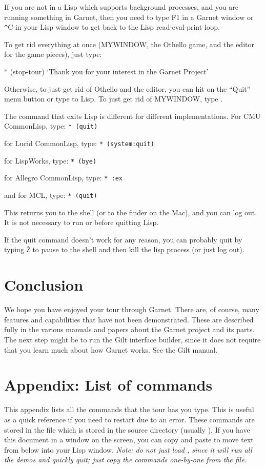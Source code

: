 If you are not in a Lisp which supports background processes, and
you are running something in Garnet, then you need to type F1 in a
Garnet window or {\texttt \^}C in your Lisp window to get back to the Lisp
read-eval-print loop.

To get rid everything at once (MYWINDOW, the Othello game, and the
editor for the game pieces), just type:
\begin{programexample}
* (stop-tour)
`Thank you for your interest in the Garnet Project'
\end{programexample}

Otherwise,
to just get rid of Othello and the editor, you can hit on the ``Quit'' menu
button or type  to Lisp.  To just get rid of MYWINDOW,
type .

The command that exits Lisp is different for different implementations.
For CMU CommonLisp, type: \verb+* (quit)+

for Lucid CommonLisp, type: \verb+* (system:quit)+

for LispWorks, type: \verb+* (bye)+

for Allegro CommonLisp, type: \verb+* :ex+

and for MCL, type: \verb+* (quit)+

This returns you to the shell (or to the finder on the Mac), and you
can log out.  It is not necessary to run  or
 before quitting Lisp.

If the quit command doesn't work for any reason,
you can probably quit by typing \texttt{\^Z} to pause to the shell and
then kill the lisp process (or just log out).

\chapter{Conclusion}
We hope you have enjoyed your tour through Garnet.  There are, of course,
many features and capabilities that have not been demonstrated.  These are
described fully in the various manuals and papers about the Garnet project
and its parts.  The next step might be to run the Gilt interface
builder, since it does not require that you learn much about how
Garnet works.  See the Gilt manual.

\chapter*{Appendix: List of commands}
This appendix lists all the commands that the tour has you type.  This is
useful as a quick reference if you need to restart due to an error.
These commands are stored in
the file  which is stored in the  source
directory (usually ).
If you have this document in a window on the screen, you can
copy 
and 
paste to move text from below into your Lisp window.
{\it Note: do
not just load , since it will run all the demos and quickly
quit; just copy the commands one-by-one from the file}.

